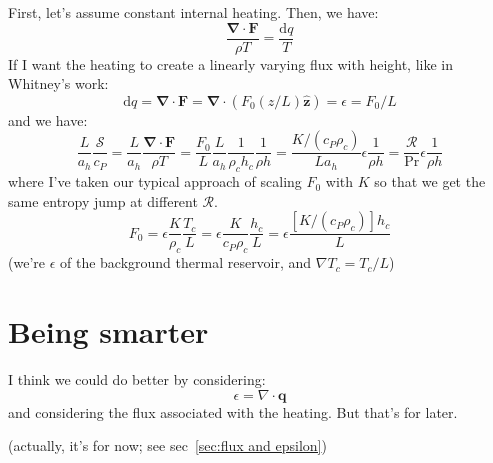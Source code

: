 \documentclass{aastex631}
\newcommand{\del}{\nabla}
\renewcommand{\vec}{\boldsymbol}
\renewcommand{\div}{\vec{\del}\cdot}
\newcommand{\scrR}{\mathcal{R}}
\newcommand{\scrS}{\mathcal{S}}
\begin{document}
First, let's assume constant internal heating.  Then, we have:
\begin{equation}
\frac{\div \vec{F}}{\rho T} = \frac{\mathrm{d}q}{T}
\end{equation}
If I want the heating to create a linearly varying flux with height, like in Whitney's work:
\begin{equation}
  \mathrm{d}q = \div \vec{F} = \div (F_0 (z/L) \vec{\hat{z}}) = \epsilon = F_0/L
\end{equation}
and we have:
\begin{equation}
\frac{L}{a_h}\frac{\scrS}{c_P} =
\frac{L}{a_h} \frac{\div \vec{F}}{\rho T} =
\frac{F_0}{L}\frac{L}{a_h}\frac{1}{\rho_c h_c}\frac{1}{\rho h} =
\frac{K/(c_P \rho_c)}{L a_h} \epsilon \frac{1}{\rho h} =
\frac{\scrR}{\mathrm{Pr}}\epsilon \frac{1}{\rho h}
\end{equation}
where I've taken our typical approach of scaling $F_0$ with $K$ so that we get the same entropy jump at different $\scrR$.
\begin{equation}
F_0 = \epsilon \frac{K}{\rho_c}\frac{T_c}{L} =
\epsilon \frac{K}{c_P \rho_c}\frac{h_c}{L} =
\epsilon\frac{[K/(c_P \rho_c)] h_c}{L}
\end{equation}
(we're $\epsilon$ of the background thermal reservoir, and $\del T_c = T_c/L$)
\label{sec:flux and epsilon}

\section{Being smarter}
I think we could do better by considering:
\begin{equation}
  \epsilon = \del \cdot \vec{q}
\end{equation}
and considering the flux associated with the heating.  But that's for later.

(actually, it's for now; see sec~\ref{sec:flux and epsilon})
\end{document}
